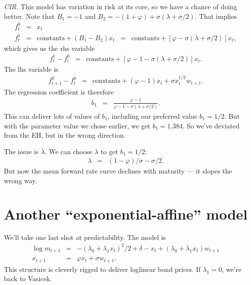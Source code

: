 \documentclass[11pt]{article}
\begin{document}
{\it CIR.\/}
This model has variation in risk at its core,
so we have a chance of doing better.
Note that $B_1 = -1$ and $B_2 = -(1+\varphi) + \sigma(\lambda + \sigma/2)$.
That implies
\begin{eqnarray*}
    f^0_t &=& x_t \\
    f^1_t &=& \mbox{constants} + (B_1-B_2) x_t
            \;\;=\;\; \mbox{constants} + [\varphi-\sigma(\lambda+\sigma/2)] x_t ,
\end{eqnarray*}
which gives us the rhs variable
\begin{eqnarray*}
    f^1_t - f^0_t &=& \mbox{constants} + [\varphi-1-\sigma(\lambda+\sigma/2)] x_t .
\end{eqnarray*}
The lhs variable is
\begin{eqnarray*}
    f^0_{t+1} - f^0_t &=&  \mbox{constants} + (\varphi-1) x_t + \sigma x_t^{1/2} w_{t+1}.
\end{eqnarray*}
The regression coefficient is therefore
\begin{eqnarray*}
    b_1 &=& \frac{\varphi-1}{\varphi-1-\sigma(\lambda+\sigma/2)} .
\end{eqnarray*}
This can deliver lots of values of $b_1$, including our preferred value $b_1 = 1/2$.
But with the parameter value we chose earlier, we get $b_1 = 1.384$.
So we've deviated from the EH, but in the wrong direction.

The issue is $\lambda$.  We can choose $\lambda$ to get $b_1 = 1/2$:
\begin{eqnarray*}
    \lambda &=& (1-\varphi)/\sigma - \sigma/2 .
\end{eqnarray*}
But now the mean forward rate curve declines with maturity ---
it slopes the wrong way.



\section{Another ``exponential-affine'' model}


We'll take one last shot at predictability.
The model is
\begin{eqnarray*}
    \log m_{t+1} &=& - (\lambda_0 + \lambda_1 x_t)^2/2 + \delta - x_t
            + (\lambda_0 + \lambda_1 x_t) w_{t+1} \\
            x_{t+1} &=& \varphi x_t + \sigma w_{t+1} .
\end{eqnarray*}
This structure is cleverly rigged to deliver loglinear bond prices.
If $\lambda_1 = 0$, we're back to Vasicek.
\end{document}
